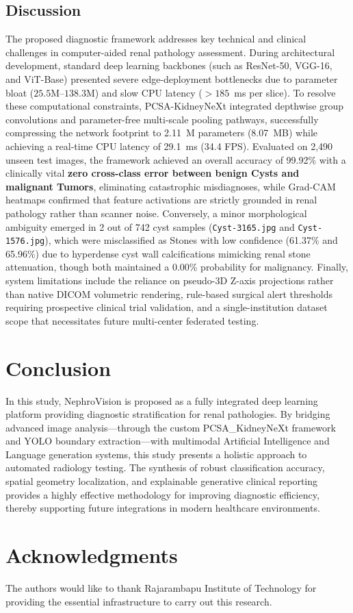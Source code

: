 \documentclass[]{elsarticle}
\begin{document}
\subsection{Discussion}
The proposed diagnostic framework addresses key technical and clinical challenges in computer-aided renal pathology assessment. During architectural development, standard deep learning backbones (such as ResNet-50, VGG-16, and ViT-Base) presented severe edge-deployment bottlenecks due to parameter bloat ($25.5\text{M}$--$138.3\text{M}$) and slow CPU latency ($>185$~ms per slice). To resolve these computational constraints, PCSA-KidneyNeXt integrated depthwise group convolutions and parameter-free multi-scale pooling pathways, successfully compressing the network footprint to 2.11~M parameters (8.07~MB) while achieving a real-time CPU latency of 29.1~ms (34.4 FPS). Evaluated on 2,490 unseen test images, the framework achieved an overall accuracy of 99.92\% with a clinically vital \textbf{zero cross-class error between benign Cysts and malignant Tumors}, eliminating catastrophic misdiagnoses, while Grad-CAM heatmaps confirmed that feature activations are strictly grounded in renal pathology rather than scanner noise. Conversely, a minor morphological ambiguity emerged in 2 out of 742 cyst samples (\texttt{Cyst-3165.jpg} and \texttt{Cyst-1576.jpg}), which were misclassified as Stones with low confidence (61.37\% and 65.96\%) due to hyperdense cyst wall calcifications mimicking renal stone attenuation, though both maintained a 0.00\% probability for malignancy. Finally, system limitations include the reliance on pseudo-3D Z-axis projections rather than native DICOM volumetric rendering, rule-based surgical alert thresholds requiring prospective clinical trial validation, and a single-institution dataset scope that necessitates future multi-center federated testing.
\section{Conclusion}
\label{sec:conclusion}

In this study, NephroVision is proposed as a fully integrated deep learning platform providing diagnostic stratification for renal pathologies. By bridging advanced image analysis—through the custom PCSA\_KidneyNeXt framework and YOLO boundary extraction—with multimodal Artificial Intelligence and Language generation systems, this study presents a holistic approach to automated radiology testing. The synthesis of robust classification accuracy, spatial geometry localization, and explainable generative clinical reporting provides a highly effective methodology for improving diagnostic efficiency, thereby supporting future integrations in modern healthcare environments.


\section*{Acknowledgments}
The authors would like to thank Rajarambapu Institute of Technology for providing the essential infrastructure to carry out this research.

 

\end{document}
